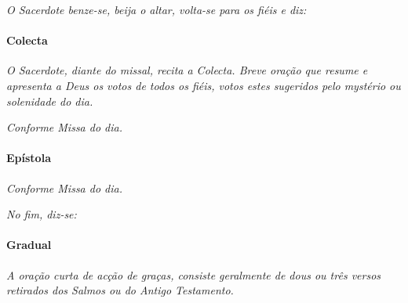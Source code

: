 \textit{O Sacerdote benze-se, beija o altar, volta-se para os fiéis e diz:}

\begin{paracol}{2}\switchcolumn{}\switchcolumn*{}\switchcolumn{}\end{paracol}

\paragraph{Colecta}

\textit{O Sacerdote, diante do missal, recita a Colecta. Breve oração que resume e apresenta a Deus os votos de todos os fiéis, votos estes sugeridos pelo mystério ou solenidade do dia.}

\begin{paracol}{2}\switchcolumn{}\end{paracol}

\emph{Conforme Missa do dia.}

\begin{paracol}{2}\switchcolumn{}\switchcolumn*{}\switchcolumn{}\end{paracol}

\paragraph{Epístola}

\emph{Conforme Missa do dia.}

\textit{No fim, diz-se:}

\begin{paracol}{2}\switchcolumn{}\end{paracol}

\paragraph{Gradual}

\textit{A oração curta de acção de graças, consiste geralmente de dous ou três versos retirados dos Salmos ou do Antigo Testamento.}

